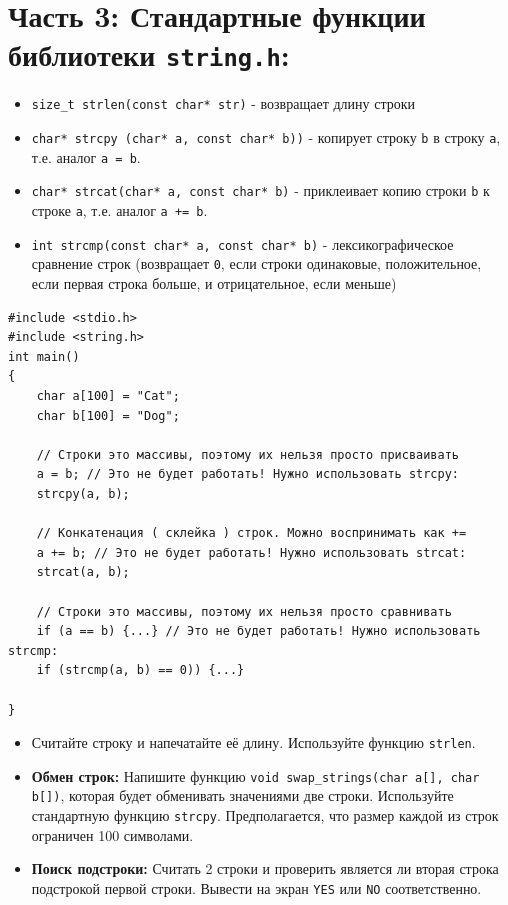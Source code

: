 \documentclass{article}
\begin{document}
\section*{Часть 3: Стандартные функции библиотеки \texttt{string.h}:}
\begin{itemize}
\item \texttt{size\_t strlen(const char* str)} - возвращает длину строки
\item \texttt{char* strcpy (char* a, const char* b))} - копирует строку \texttt{b} в строку \texttt{a}, т.е. аналог \texttt{a = b}.
\item \texttt{char* strcat(char* a, const char* b)} - приклеивает копию строки \texttt{b} к строке \texttt{a}, т.е. аналог \texttt{a += b}.
\item \texttt{int strcmp(const char* a, const char* b)} - лексикографическое сравнение строк (возвращает \texttt{0}, если строки одинаковые, положительное, если первая строка больше, и отрицательное, если меньше)

\end{itemize}
\begin{lstlisting}
#include <stdio.h>
#include <string.h>
int main() 
{
    char a[100] = "Cat";
    char b[100] = "Dog";
	
    // Строки это массивы, поэтому их нельзя просто присваивать 
    a = b; // Это не будет работать! Нужно использовать strcpy:
    strcpy(a, b);
    
    // Конкатенация ( склейка ) строк. Можно воспринимать как +=
    a += b; // Это не будет работать! Нужно использовать strcat:
    strcat(a, b);
	
    // Строки это массивы, поэтому их нельзя просто сравнивать
    if (a == b) {...} // Это не будет работать! Нужно использовать strcmp:
    if (strcmp(a, b) == 0)) {...} 
	
}
\end{lstlisting}

\begin{itemize}
\item Считайте строку и напечатайте её длину. Используйте функцию \texttt{strlen}.
\item \textbf{Обмен строк:} Напишите функцию \texttt{void swap\_strings(char a[], char b[])}, которая будет обменивать значениями две строки. Используйте стандартную функцию \texttt{strcpy}. Предполагается, что размер каждой из строк ограничен 100 символами.
\item \textbf{Поиск подстроки:} Считать 2 строки и проверить является ли вторая строка подстрокой первой строки. Вывести на экран \texttt{YES} или \texttt{NO} соответственно.
\end{itemize}
\end{document}

